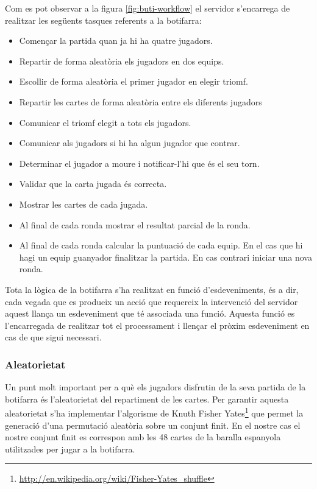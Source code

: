 \newpage

Com es pot observar a la figura \ref{fig:buti-workflow} el servidor s'encarrega de realitzar les següents tasques referents a la botifarra: 

\begin{itemize}
\item{Començar la partida quan ja hi ha quatre jugadors. }
\item{Repartir de forma aleatòria els jugadors en dos equips. }
\item{Escollir de forma aleatòria el primer jugador en elegir triomf.}
\item{Repartir les cartes de forma aleatòria entre els diferents jugadors}
\item{Comunicar el triomf elegit a tots els jugadors.}
\item{Comunicar als jugadors si hi ha algun jugador que contrar.}
\item{Determinar el jugador a moure i notificar-l'hi que és el seu torn.}
\item{Validar que la carta jugada és correcta.}
\item{Mostrar les cartes de cada jugada.}
\item{Al final de cada ronda mostrar el resultat parcial de la ronda. }
\item{Al final de cada ronda calcular la puntuació de cada equip. En el cas que hi hagi un equip guanyador finalitzar la partida. En cas contrari iniciar una nova ronda.}
\end{itemize}

Tota la lògica de la botifarra s'ha realitzat en funció d'esdeveniments, és a dir, cada vegada que es produeix un acció que requereix la intervenció del servidor aquest llança un esdeveniment que té associada una funció. Aquesta funció es l'encarregada de realitzar tot el processament i llençar el pròxim esdeveniment en cas de que sigui necessari.  


\subsubsection{Aleatorietat}

Un punt molt important per a què els jugadors disfrutin de la seva partida de la botifarra és l'aleatorietat del repartiment de les cartes. Per garantir aquesta aleatorietat s'ha implementar l'algorisme de Knuth Fisher Yates\footnote{\url{http://en.wikipedia.org/wiki/Fisher-Yates_shuffle}} que permet la generació d'una permutació aleatòria sobre un conjunt finit. En el nostre cas el nostre conjunt finit es correspon amb les 48 cartes de la baralla espanyola utilitzades per jugar a la botifarra. 


